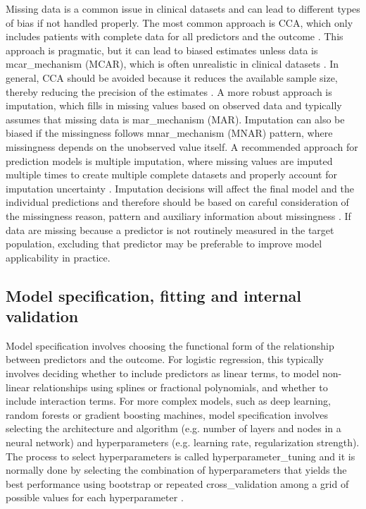 Missing data is a common issue in clinical datasets and can lead to different types of bias if not handled properly. The most common approach is \gls{CCA}, which only includes patients with complete data for all predictors and the outcome \cite{eekhoutMissingDataSystematic2012}. This approach is pragmatic, but it can lead to biased estimates unless data is \gls{mcar_mechanism} (\gls{MCAR}), which is often unrealistic in clinical datasets \cite{vanderheijdenImputationMissingValues2006}. In general, \gls{CCA} should be avoided because it reduces the available sample size, thereby reducing the precision of the estimates \cite{Hughes2019}. A more robust approach is imputation, which fills in missing values based on observed data and typically assumes that missing data is \gls{mar_mechanism} (\gls{MAR}). Imputation can also be biased if the missingness follows \gls{mnar_mechanism} (\gls{MNAR}) pattern, where missingness depends on the unobserved value itself. A recommended approach for prediction models is multiple imputation, where missing values are imputed multiple times to create multiple complete datasets and properly account for imputation uncertainty \cite{siskImputationMissingIndicators2023}. Imputation decisions will affect the final model and the individual predictions and therefore should be based on careful consideration of the missingness reason, pattern and auxiliary information about missingness \cite{hughesAccountingMissingData2019}. If data are missing because a predictor is not routinely measured in the target population, excluding that predictor may be preferable to improve model applicability in practice.



\subsection{Model specification, fitting and internal validation}

Model specification involves choosing the functional form of the relationship between predictors and the outcome. For logistic regression, this typically involves deciding whether to include predictors as linear terms, to model non-linear relationships using splines or fractional polynomials, and whether to include interaction terms. For more complex models, such as deep learning, random forests or gradient boosting machines, model specification involves selecting the architecture and algorithm (e.g. number of layers and nodes in a neural network) and hyperparameters (e.g. learning rate, regularization strength). The process to select hyperparameters is called \gls{hyperparameter_tuning} and it is normally done by selecting the combination of hyperparameters that yields the best performance using \gls{bootstrap} or repeated \gls{cross_validation} among a grid of possible values for each hyperparameter  \cite{duniasComparisonHyperparameterTuning2024}. 

